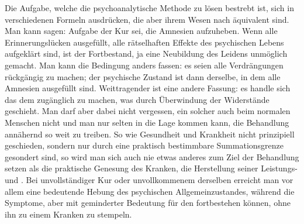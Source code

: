 \documentclass[twoside=true,titlepage=false,open=any, parskip=never, fontsize=10pt, headings=small, chapterprefix=false, appendixprefix=false]{scrbook}
\begin{document}
            
        \pstart
        Die Aufgabe, welche die psychoanalytische Methode zu lösen bestrebt ist,  sich in verschiedenen Formeln ausdrücken, die aber ihrem Wesen nach
               äquivalent sind. Man kann sagen: Aufgabe der Kur sei, die Amnesien
               aufzuheben. Wenn alle Erinnerungslücken ausgefüllt, alle rätselhaften Effekte
               des psychischen Lebens aufgeklärt sind, ist der Fortbestand, ja
               eine Neubildung des Leidens unmöglich gemacht. Man kann die Bedingung
               anders fassen: es seien alle Verdrängungen rückgängig zu machen; der psychische
               Zustand ist dann derselbe, in dem alle Amnesien ausgefüllt sind. Weittragender
               ist eine andere Fassung: es handle sich  das  dem  zugänglich zu machen, was durch Überwindung der Widerstände
               geschieht. Man darf aber dabei nicht vergessen,  ein solcher
                auch beim normalen Menschen nicht  und
                man nur selten in die Lage kommen kann, die Behandlung annähernd so weit
               zu treiben. So wie Gesundheit und Krankheit nicht prinzipiell geschieden,
               sondern nur durch eine praktisch bestimmbare Summationsgrenze gesondert sind, so
               wird man sich auch nie etwas anderes zum Ziel der Behandlung setzen als die
               praktische Genesung des Kranken, die Herstellung seiner Leistungs-  und . Bei unvollständiger Kur oder unvollkommenem  derselben erreicht man vor allem eine bedeutende Hebung des psychischen
               Allgemeinzustandes, während die Symptome, aber mit geminderter Bedeutung für den  fortbestehen können, ohne ihn zu einem Kranken zu stempeln.
        \pend
    
\end{document}
